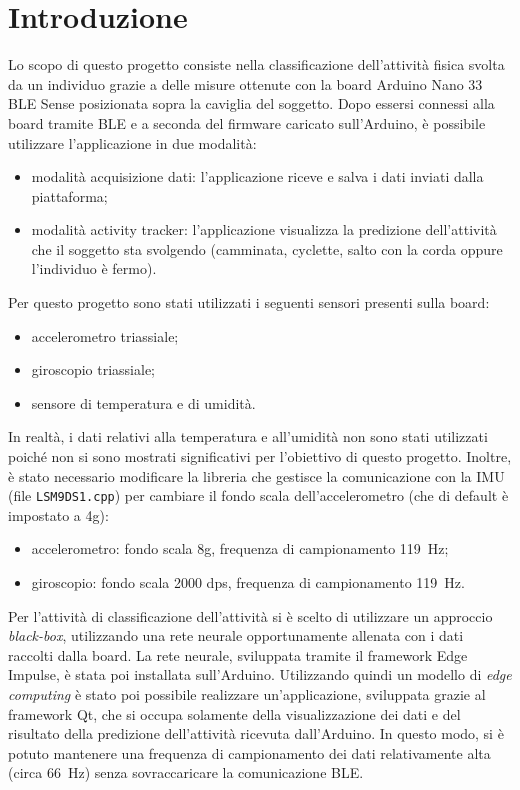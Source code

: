 \section{Introduzione}
Lo scopo di questo progetto consiste nella classificazione dell'attività fisica svolta da un individuo grazie a delle misure ottenute con la board Arduino Nano 33 BLE Sense posizionata sopra la caviglia del soggetto. Dopo essersi connessi alla board tramite BLE e a seconda del firmware caricato sull'Arduino, è possibile utilizzare l'applicazione in due modalità:
\begin{itemize}
	\item modalità acquisizione dati: l'applicazione riceve e salva i dati inviati dalla piattaforma;
	\item modalità activity tracker: l'applicazione visualizza la predizione dell'attività che il soggetto sta svolgendo (camminata, cyclette, salto con la corda oppure l'individuo è fermo).
\end{itemize}
Per questo progetto sono stati utilizzati i seguenti sensori presenti sulla board:
\begin{itemize}
	\item accelerometro triassiale; 
	\item giroscopio triassiale;
	\item sensore di temperatura e di umidità.
\end{itemize}
In realtà, i dati relativi alla temperatura e all'umidità non sono stati utilizzati poiché non si sono mostrati significativi per l'obiettivo di questo progetto. Inoltre, è stato necessario modificare la libreria che gestisce la comunicazione con la IMU (file \texttt{LSM9DS1.cpp}) per cambiare il fondo scala dell'accelerometro (che di default è impostato a 4g):
\begin{itemize}
	\item accelerometro: fondo scala 8g, frequenza di campionamento \SI{119}{\hertz};
	\item giroscopio: fondo scala 2000 dps, frequenza di campionamento \SI{119}{\hertz}.
\end{itemize}

Per l'attività di classificazione dell'attività si è scelto di utilizzare un approccio \textit{black-box}, utilizzando una rete neurale opportunamente allenata con i dati raccolti dalla board. La rete neurale, sviluppata tramite il framework Edge Impulse, è stata poi installata sull'Arduino. Utilizzando quindi un modello di \textit{edge computing} è stato poi possibile realizzare un'applicazione, sviluppata grazie al framework Qt, che si occupa solamente della visualizzazione dei dati e del risultato della predizione dell'attività ricevuta dall'Arduino. In questo modo, si è potuto mantenere una frequenza di campionamento dei dati relativamente alta (circa \SI{66}{\hertz}) senza sovraccaricare la comunicazione BLE.

